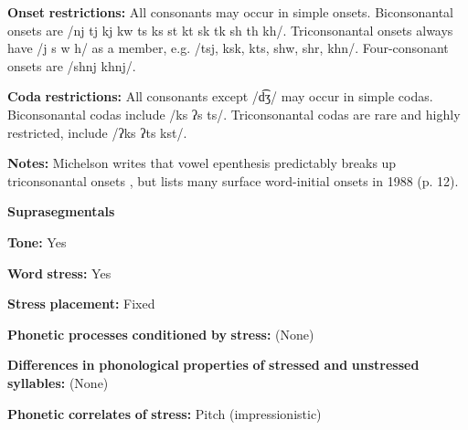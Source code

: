 \documentclass[output=paper]{langsci/langscibook}
\begin{document}
\begin{styleBody}
\textbf{Onset} \textbf{restrictions:} All consonants may occur in simple onsets. Biconsonantal onsets are /nj tj kj kw ts ks st kt sk tk sh th kh/. Triconsonantal onsets always have /j s w h/ as a member, e.g. /tsj, ksk, kts, shw, shr, khn/. Four-consonant onsets are /shnj khnj/.
\end{styleBody}

\begin{styleBody}
\textbf{Coda} \textbf{restrictions:} All consonants except /d͡ʒ/ may occur in simple codas. Biconsonantal codas include /ks ʔs ts/. Triconsonantal codas are rare and highly restricted, include /ʔks ʔts kst/.
\end{styleBody}

\begin{styleBody}
\textbf{Notes:} Michelson writes that vowel epenthesis predictably breaks up triconsonantal onsets , but lists many surface word-initial onsets in 1988 (p. 12).
\end{styleBody}

\begin{styleBody}
\textbf{Suprasegmentals}
\end{styleBody}

\begin{styleBody}
\textbf{Tone:} Yes
\end{styleBody}

\begin{styleBody}
\textbf{Word} \textbf{stress:} Yes
\end{styleBody}

\begin{styleBody}
\textbf{Stress} \textbf{placement:} Fixed
\end{styleBody}

\begin{styleBody}
\textbf{Phonetic} \textbf{processes} \textbf{conditioned} \textbf{by} \textbf{stress:} (None)
\end{styleBody}

\begin{styleBody}
\textbf{Differences} \textbf{in} \textbf{phonological} \textbf{properties} \textbf{of} \textbf{stressed} \textbf{and} \textbf{unstressed} \textbf{syllables:} (None)
\end{styleBody}

\begin{styleBody}
\textbf{Phonetic} \textbf{correlates} \textbf{of} \textbf{stress:} Pitch (impressionistic)
\end{styleBody}
\end{document}
